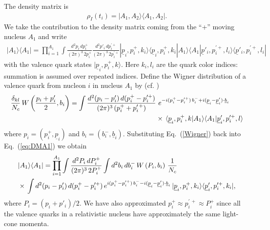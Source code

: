 \documentclass[onecolumn,showpacs,nobibnotes,nofootinbib,12pt,aps,prd,showpacs,notitlepage,nofootinbib,preprintnumbers,amsmath,amssymb]{article}
\def\eq#1{{Eq.~(\ref{#1})}}
\newcommand{\un}[1]{\underline{#1}}
\begin{document}
The density matrix is
\begin{align}
  \label{eq:DMinit1}
  \rho_I(t_i)= | A_1, A_2 \rangle \langle A_1, A_2 |. 
\end{align}
We take the contribution to the density matrix coming from the ``+''
moving nucleus $A_1$ and write
\begin{align}
  \label{eq:DMA1}
  | A_1 \rangle \langle A_1 | = \prod_{i=1}^{A_1} \int \frac{d^2 p_i
    \, dp_i^+}{(2\pi)^3\, 2p_i^+} \frac{d^2 p'_i \, dp_i^{\prime
      +}}{(2\pi)^3\, 2p_i^{\prime +}} | \un{p}_i, p_i^+, k_i \rangle
  \langle \un{p}_i, p_i^+, k_i | A_1 \rangle \langle A_1 | \un{p}'_i,
  p_i^{\prime +}, l_i \rangle \langle \un{p}'_i, p_i^{\prime +}, l_i |
\end{align}
with the valence quark states $| \un{p}_i, p_i^+, k \rangle$. Here
$k_i, l_i$ are the quark color indices: summation is assumed over
repeated indices. Define the Wigner distribution of a valence quark
from nucleon $i$ in nucleus $A_1$ by
(cf. \cite{Kovchegov:2013cva,Kovchegov:2015zha})
\begin{align}\label{Wigner}
  \frac{\delta_{kl}}{N_c} \, W \left( \frac{p_i + p'_i}{2}, b_i
  \right) = \int \frac{d^2 (p_i - p'_i) \, d(p_i^+ - p_i^{\prime
      +})}{(2\pi)^3\, (p_i^+ + p^{\prime \, +}_i)} & \ e^{- i (p_i^+ -
    p_i^{\prime +}) \, b_i^- + i (\un{p}_i - \un{p}'_i) \cdot
    \un{b}_i} \notag \\ & \times \, \langle \un{p}_i, p_i^+, k | A_1
  \rangle \langle A_1 | \un{p}'_i, p_i^{\prime +}, l \rangle
\end{align}
where $p_i = (p_i^+, \un{p}_i)$ and $b_i = (b_i^-,
\un{b}_i)$. Substituting \eq{Wigner} back into \eq{eq:DMA1} we obtain
\begin{align}\label{eq:DMA2}
  & | A_1 \rangle \langle A_1 | = \prod_{i=1}^{A_1} \int \frac{d^2 P_i
    \, dP_i^+}{(2\pi)^3\, 2 P_i^+} \int d^2 b_i \, d b_i^- \, W \left(
    P_i, b_i \right) \, \frac{1}{N_c} \notag \\ & \times \, \int d^2
  (p_i - p'_i) \, d(p_i^+ - p_i^{\prime +}) \, e^{i (p_i^+ -
    p_i^{\prime +}) \, b_i^- - i (\un{p}_i - \un{p}'_i) \cdot
    \un{b}_i} \, | \un{p}_i, p_i^+, k_i \rangle \langle \un{p}'_i,
  p_i^{\prime +}, k_i |,
\end{align}
where $P_i = (p_i + p'_i)/2$. We have also approximated $p_i^+ \approx
p_i^{\prime \, +} \approx P_i^+$ since all the valence quarks in a
relativistic nucleus have approximately the same light-cone momenta.
\end{document}

